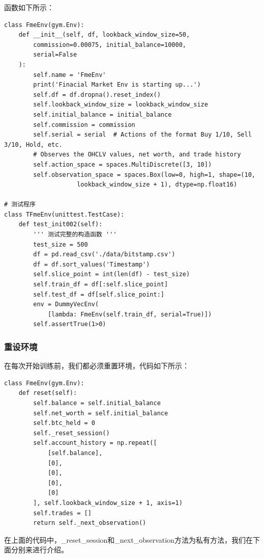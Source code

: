 \documentclass{article}
\begin{document}
函数如下所示：
\begin{lstlisting}
class FmeEnv(gym.Env):
    def __init__(self, df, lookback_window_size=50,
        commission=0.00075, initial_balance=10000,
        serial=False
    ):
        self.name = 'FmeEnv'
        print('Finacial Market Env is starting up...')
        self.df = df.dropna().reset_index()
        self.lookback_window_size = lookback_window_size
        self.initial_balance = initial_balance
        self.commission = commission
        self.serial = serial  # Actions of the format Buy 1/10, Sell 3/10, Hold, etc.
        # Observes the OHCLV values, net worth, and trade history
        self.action_space = spaces.MultiDiscrete([3, 10])
        self.observation_space = spaces.Box(low=0, high=1, shape=(10, 
                    lookback_window_size + 1), dtype=np.float16)

# 测试程序
class TFmeEnv(unittest.TestCase):
    def test_init002(self):
        ''' 测试完整的构造函数 '''
        test_size = 500
        df = pd.read_csv('./data/bitstamp.csv')
        df = df.sort_values('Timestamp')
        self.slice_point = int(len(df) - test_size)
        self.train_df = df[:self.slice_point]
        self.test_df = df[self.slice_point:]
        env = DummyVecEnv(
            [lambda: FmeEnv(self.train_df, serial=True)])
        self.assertTrue(1>0)
\end{lstlisting}
\subsubsection{重设环境}
在每次开始训练前，我们都必须重置环境，代码如下所示：
\begin{lstlisting}
class FmeEnv(gym.Env):
    def reset(self):
        self.balance = self.initial_balance
        self.net_worth = self.initial_balance
        self.btc_held = 0
        self._reset_session()
        self.account_history = np.repeat([
            [self.balance],
            [0],
            [0],
            [0],
            [0]
        ], self.lookback_window_size + 1, axis=1)
        self.trades = []
        return self._next_observation()
\end{lstlisting}
在上面的代码中，\_reset\_session和\_next\_observation方法为私有方法，我们在下面分别来进行介绍。
\end{document}
